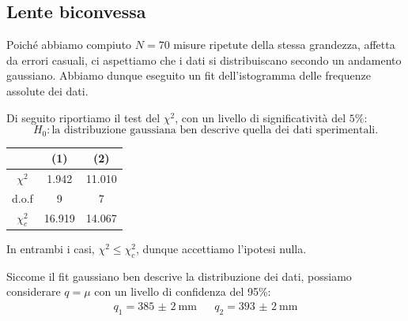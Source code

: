 \documentclass[a4paper]{article}
\begin{document}
    \subsection{Lente biconvessa}
    Poiché abbiamo compiuto $N=70$ misure ripetute della stessa grandezza, affetta da errori casuali, ci aspettiamo che i dati si distribuiscano secondo un andamento gaussiano. Abbiamo dunque eseguito un fit dell'istogramma delle frequenze assolute dei dati.
    \begin{figure}[H]%
    	\centering
    	\qquad
    \end{figure}
    Di seguito riportiamo il test del $\chi^2$, con un livello di significatività del $5\%$:
    \[
    H_0: \text{la distribuzione gaussiana ben descrive quella dei dati sperimentali.}
    \]
    \begin{table}[H]
    	\centering
    	\begin{tabular}{|c|c|c|}
    		\hline
    		 & (1) & (2) \\ \hline
    		$\chi^2$ & 1.942 & 11.010 \\
    		d.o.f & 9 & 7 \\
    		$\chi^2_c$ & 16.919 & 14.067 \\ \hline
    	\end{tabular}
    	\label{tab:chi-quadro-biconvessa}
    \end{table}
    In entrambi i casi, $\chi^2\leq\chi^2_c$, dunque accettiamo l'ipotesi nulla.
    
    Siccome il fit gaussiano ben descrive la distribuzione dei dati, possiamo considerare $q=\mu$ con un livello di confidenza del 95\%:
    \begin{align*}
    	q_1 = \SI{385(2)}{\mm} && q_2 = \SI{393(2)}{\mm}
    \end{align*}
    
\end{document}
